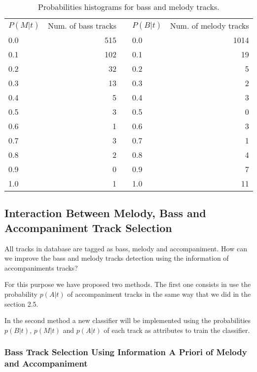 \documentclass{article}
\begin{document}
\begin{table}
\small
\begin{center}
\begin{tabular}{  l | r  r  l | r }
\cline{1-2}\cline{4-5}
$P(M|t)$ & Num. of bass tracks &  & $P(B|t)$ & Num. of melody tracks \\
\cline{1-2}\cline{4-5}
\cline{1-2}\cline{4-5}
0.0 & 515 &  & 0.0 & 1014 \\
0.1 & 102 &  & 0.1 & 19 \\
0.2 & 32 &  & 0.2 & 5 \\
0.3 & 13 &  & 0.3 & 2 \\
0.4 & 5 &  & 0.4 & 3 \\
0.5 & 3 &  & 0.5 & 0 \\
0.6 & 1 &  & 0.6 & 3 \\
0.7 & 3 &  & 0.7 & 1 \\
0.8 & 2 &  & 0.8 & 4 \\
0.9 & 0 &  & 0.9 & 7 \\
1.0 & 1 &  & 1.0 & 11 \\
\cline{1-2}\cline{4-5}
\end{tabular}
\caption{Probabilities histograms for bass and melody tracks.}
\label{table18}
\end{center}
\end{table}







\subsection{Interaction Between Melody, Bass and Accompaniment Track Selection}

All tracks in database are tagged as bass, melody and accompaniment. How can we improve the bass and melody tracks detection using the information of accompaniments tracks?

For this purpose we have proposed two methods. The first one consists in use the probability $p(A|t)$ of accompaniment tracks in the same way that we did in the section 2.5.

In the second method a new classifier will be implemented using the probabilities $p(B|t)$, $p(M|t)$ and $p(A|t)$ of each track as attributes to train the classifier.


\subsubsection{Bass Track Selection Using Information A Priori of Melody and Accompaniment}
\end{document}

